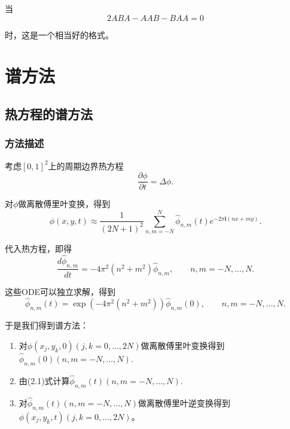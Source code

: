 \documentclass[lang=cn,10pt,bibend=bibtex]{elegantbook}
\begin{document}
当
\begin{equation}
    2ABA-AAB-BAA=0
\end{equation}

时，这是一个相当好的格式。

\vspace{5em}

\chapter{谱方法}

\vspace{-1em}

\section{热方程的谱方法}

\subsection{方法描述}

考虑$[0,1]^2$上的周期边界热方程
\begin{equation*}
    \frac{\partial \phi}{\partial t}=\Delta \phi.
\end{equation*}

对$\phi$做离散傅里叶变换，得到
\begin{equation*}
    \phi(x,y,t)\approx \frac{1}{(2N+1)^2} \sum_{n,m=-N}^N \hat{\phi}_{n,m}(t)e^{-2\pi\mathbf{i}(nx+my)}.
\end{equation*}

代入热方程，即得
\begin{equation*}
    \frac{d \hat{\phi}_{n,m}}{d t}=-4\pi^2(n^2+m^2) \hat{\phi}_{n,m},\qquad n,m=-N,...,N.
\end{equation*}

这些ODE可以独立求解，得到
\begin{equation}
    \hat{\phi}_{n,m}(t)=\exp(-4\pi^2(n^2+m^2)) \hat{\phi}_{n,m}(0),\qquad n,m=-N,...,N.
\end{equation}

于是我们得到谱方法：
\begin{enumerate}
    \item 对$\phi(x_j,y_k,0)(j,k=0,...,2N)$做离散傅里叶变换得到$\hat{\phi}_{n,m}(0)(n,m=-N,...,N)$.
    \item 由(2.1)式计算$\hat{\phi}_{n,m}(t)(n,m=-N,...,N)$.
    \item 对$\hat{\phi}_{n,m}(t)(n,m=-N,...,N)$做离散傅里叶逆变换得到$\phi(x_j,y_k,t)(j,k=0,...,2N)$。
\end{enumerate}
\end{document}
